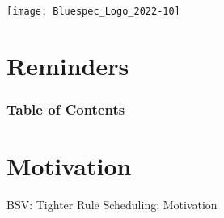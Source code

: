 


\date{L17: {\BSV}: Tighter Rule scheduling with CRegs}





\begin{frame}
\titlepage

\begin{center}
 \texttt{[image: Bluespec\_Logo\_2022-10]}
\end{center}

\end{frame}


\section{Reminders}




\begin{frame}
\frametitle{Table of Contents}

\tableofcontents

\end{frame}


\section{Motivation}

\begin{frame}

\begin{center}
  {\LARGE BSV: Tighter Rule Scheduling: Motivation}
\end{center}

\end{frame}


